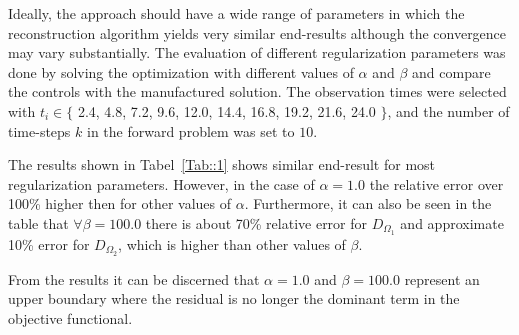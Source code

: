\documentclass[11pt,a4paper]{article}
\begin{document}
Ideally, the approach should have a wide range of parameters in which the reconstruction algorithm yields very similar end-results although the convergence may vary substantially. The evaluation of different regularization parameters was done by solving the optimization with different values of $\alpha$ and $\beta$ and compare the controls with the manufactured solution. The observation times were selected with $t_i \in  \lbrace$ 2.4, 4.8, 7.2, 9.6, 12.0, 14.4, 16.8, 19.2, 21.6, 24.0 $\rbrace$, and the number of time-steps $k$ in the forward problem was set to $10$. 

The results shown in Tabel~\ref{Tab::1} shows similar end-result for most regularization parameters. However, in the case of $ \alpha=1.0$ the relative error over 100\% higher then for other values of $\alpha$. Furthermore, it can also be seen in the table that $ \forall \beta=100.0$ there is about 70\% relative error for $D_{\Omega_1}$ and approximate 10\% error for $D_{\Omega_2}$, which is higher than other values of $\beta$. 

From the results it can be discerned that $\alpha =1.0$ and $\beta=100.0$ represent an upper  boundary where the residual is no longer the dominant term in the objective functional.  
\end{document}
